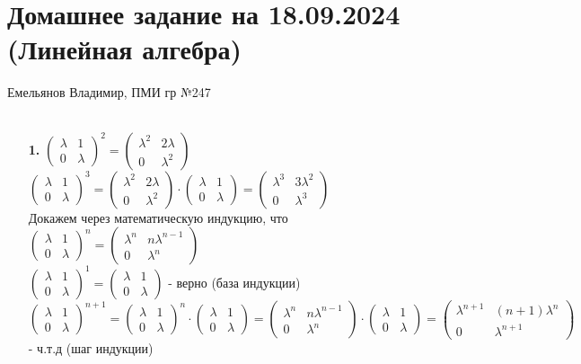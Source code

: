 \documentclass[a4paper]{article}
\newcommand{\mat}[1]{\begin{pmatrix} #1 \end{pmatrix}}
\begin{document}
\section*{Домашнее задание на 18.09.2024 (Линейная алгебра)}
{\large Емельянов Владимир, ПМИ гр №247}\\\\

\begin{enumerate}
    \item[\textbf{1.}] 
    $\mat{\lambda & 1 \\ 0 & \lambda}^2 = \mat{\lambda^2 & 2\lambda \\ 0 & \lambda^2}$\\
    $\mat{\lambda & 1 \\ 0 & \lambda}^3 = \mat{\lambda^2 & 2\lambda \\ 0 & \lambda^2} \cdot \mat{\lambda & 1 \\ 0 & \lambda} = \mat{\lambda^3 & 3\lambda^2 \\ 0 & \lambda^3}$\\
    Докажем через математическую индукцию, что $\mat{\lambda & 1 \\ 0 & \lambda}^n = \mat{\lambda^n & n\lambda^{n-1} \\ 0 & \lambda^n}$\\
    $\mat{\lambda & 1 \\ 0 & \lambda}^1 = \mat{\lambda & 1 \\ 0 & \lambda}$ - верно (база индукции)\\
    $\mat{\lambda & 1 \\ 0 & \lambda}^{n+1} = \mat{\lambda & 1 \\ 0 & \lambda}^n \cdot \mat{\lambda & 1 \\ 0 & \lambda} = \mat{\lambda^n & n\lambda^{n-1} \\ 0 & \lambda^n} \cdot \mat{\lambda & 1 \\ 0 & \lambda} = \mat{\lambda^{n+1} & (n+1)\lambda^{n} \\ 0 & \lambda^{n+1}}$ - ч.т.д (шаг индукции)


\end{enumerate}
\end{document}

